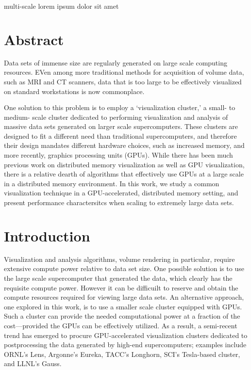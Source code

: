 multi-scale lorem ipsum dolor sit amet

\section{Abstract}

Data sets of immense size are regularly generated on large scale
computing resources.  EVen among more traditional methods for
acquisition of volume data, such as MRI and CT scanners, data that is
too large to be effectively visualized on standard workstations is now
commonplace.

One solution to this problem is to employ a `visualization cluster,' a
small- to medium- scale cluster dedicated to performing visualization
and analysis of massive data sets generated on larger scale
supercomputers. These clusters are designed to fit a different
need than traditional supercomputers, and therefore their design
mandates different hardware choices, such as increased memory, and
more recently, graphics processing units (GPUs).  While there has
been much previous work on distributed memory visualization as well
as GPU visualization, there is a relative dearth of algorithms
that effectively use GPUs at a large scale in a distributed memory
environment.  In this work, we study a common visualization technique
in a GPU-accelerated, distributed memory setting, and present
performance charactersitcs when scaling to extremely large data sets.

\section{Introduction}

Visualization and analysis algorithms, volume rendering in particular,
require extensive compute power relative to data set size.  One
possible solution is to use the large scale supercomputer that
generated the data, which clearly has the requisite compute power.
However it can be difficuilt to reserve and obtain the compute
resources required for viewing large data sets.  An alternative
approach, one explored in this work, is to use a smaller scale
cluster equipped with GPUs.  Such a cluster can provide the needed
computational power at a fraction of the cost---provided the GPUs
can be effectively utilized.  As a result, a semi-recent trend has
emerged to procure GPU-accelerated visualization clusters dedicated
to postprocessing the data generated by high-end supercomputers;
examples include ORNL's Lens, Argonne's Eureka, TACC's Longhorn, SCI's
Tesla-based cluster, and LLNL's Gauss.

